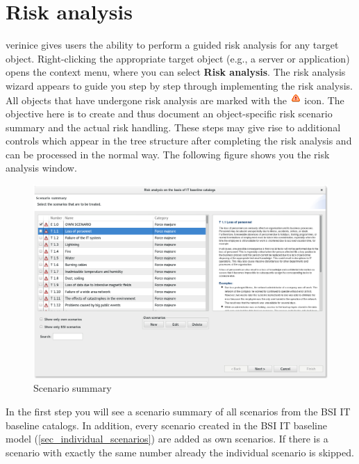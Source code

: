 \documentclass[a4paper,10pt]{book}
\begin{document}
\section{Risk analysis} \label{sec:risk-analysis}
verinice gives users the ability to perform a guided risk analysis for any target object. Right-clicking the appropriate target object
(e.g., a server or application) opens the context menu, where you can select \textbf{Risk analysis}.
The risk analysis wizard appears to guide you step by step through implementing the risk analysis.
All objects that have undergone risk analysis are marked with the
\includegraphics[height=2ex]{Icon/Risikoanalyse.png} icon. The objective here is to create and thus
document an object-specific risk scenario summary and the actual risk handling. These steps may give
rise to additional controls which appear in the tree structure after completing the risk analysis
and can be processed in the normal way. The following figure shows you the risk analysis window.
\newline
\begin{figure}[htb!]
  \centering
  \includegraphics[width=\textwidth]{Screenshot/Gefaehrdungsuebersicht-en.png}
  \caption{\label{Scenario summary} Scenario summary}
\end{figure}
\newline
In the first step you will see a scenario summary of all scenarios from the BSI IT baseline
catalogs.
In addition, every scenario created in the BSI IT baseline
model (\ref{sec_individual_scenarios}) are added as own scenarios. If there is a scenario with exactly the same number already the individual scenario is skipped.\\
\end{document}
